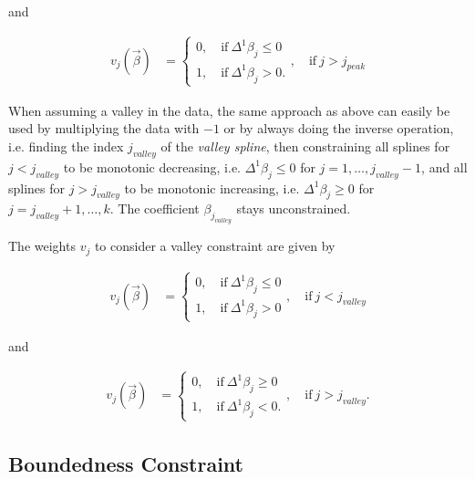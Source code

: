 \documentclass[10pt,a4paper]{article}
\begin{document}
	and 
	
	\begin{align}\label{eq:v_peak_2}
		v_j(\vec{\beta}) &= \begin{cases} 
								 		0, \quad \text{if} \ \Delta^1\beta_j \le 0 \\ 
								 		1, \quad \text{if} \ \Delta^1\beta_j > 0.
								  \end{cases}, \quad \text{if} \ j > j_{peak}
	\end{align}
	
	When assuming a valley in the data, the same approach as above can easily be used by multiplying the data with $-1$ or by always doing the inverse operation, i.e. finding the index $j_{valley}$ of the \emph{valley spline}, then constraining all splines for $j < j_{valley}$ to be monotonic decreasing, i.e. $\Delta^1 \beta_j \le 0$ for $j = 1, \dots, j_{valley}-1$, and all splines for $j > j_{valley}$ to be monotonic increasing, i.e. $\Delta^1 \beta_j \ge 0$ for $j = j_{valley}+1, \dots, k$. The coefficient $\beta_{j_{valley}}$ stays unconstrained. 
	
	The weights $v_j$ to consider a valley constraint are given by
	
	\begin{align}\label{eq:v_valley_1}
		v_j(\vec{\beta}) &= \begin{cases} 
										0, \quad \text{if} \ \Delta^1\beta_j \le 0 \\ 
										1, \quad \text{if} \ \Delta^1\beta_j > 0
								   \end{cases}, \quad \text{if} \ j < j_{valley}
	\end{align}
	
	and 
	
	\begin{align}\label{eq:v_valley_2}
		v_j(\vec{\beta}) &= \begin{cases} 
										0, \quad \text{if} \ \Delta^1\beta_j \ge 0 \\ 
										1, \quad \text{if} \ \Delta^1\beta_j < 0.
									\end{cases}, \quad \text{if} \ j > j_{valley}.
	\end{align}
	
	\subsection{Boundedness Constraint}
	
\end{document}
